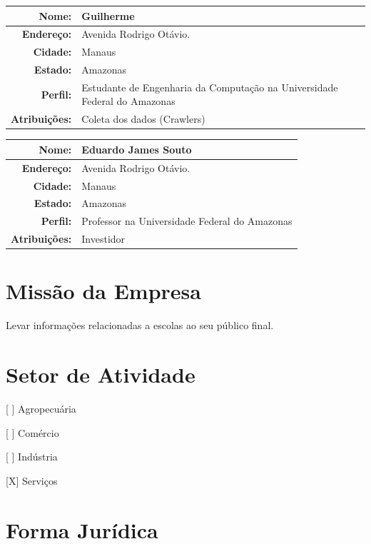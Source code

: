 \documentclass[
	12pt,				%
	openright,			%
	twoside,			%
	a4paper,			%
	english,			%
	french,				%
	spanish,			%
	brazil,				%
	]{abntex2}
\begin{document}
\begin{center}
	\begin{tabular}{|r|p{12cm}|}
		\hline
		\textbf{Nome:}		& Guilherme \\ \hline
		\textbf{Endereço:}	& Avenida Rodrigo Otávio. \\ \hline
		\textbf{Cidade:}	& Manaus \\ \hline
		\textbf{Estado:}	& Amazonas \\ \hline
		\textbf{Perfil:}	& Estudante de Engenharia da Computação na Universidade Federal do Amazonas\\ \hline
		\textbf{Atribuições:}	& Coleta dos dados (Crawlers) \\ \hline
	\end{tabular}
\end{center}

\begin{center}
	\begin{tabular}{|r|p{12cm}|}
		\hline
		\textbf{Nome:}		& Eduardo James Souto \\ \hline
		\textbf{Endereço:}	& Avenida Rodrigo Otávio. \\ \hline
		\textbf{Cidade:}	& Manaus \\ \hline
		\textbf{Estado:}	& Amazonas \\ \hline
		\textbf{Perfil:}	& Professor na Universidade Federal do Amazonas \\ \hline
		\textbf{Atribuições:}	& Investidor \\ \hline
	\end{tabular}
\end{center}

\section{Missão da Empresa}

Levar informações relacionadas a escolas ao seu público final.

\section{Setor de Atividade}

[ ] Agropecuária

[ ] Comércio

[ ] Indústria

[X] Serviços

\section{Forma Jurídica}
\end{document}
